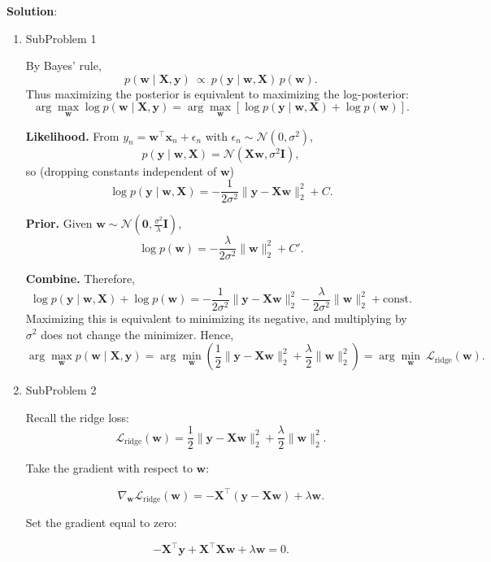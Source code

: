 \documentclass[submit]{harvardml}
\newenvironment{solution}{
    \vspace{2mm}
    \color{blue}\noindent\textbf{Solution}:
}{}
\begin{document}
\begin{solution}
	\begin{enumerate}
	    \item SubProblem 1

By Bayes' rule,
\[
p(\mathbf w\mid \mathbf X,\mathbf y)\ \propto\ p(\mathbf y\mid \mathbf w,\mathbf X)\,p(\mathbf w).
\]
Thus maximizing the posterior is equivalent to maximizing the log-posterior:
\[
\arg\max_{\mathbf w}\log p(\mathbf w\mid \mathbf X,\mathbf y)
=
\arg\max_{\mathbf w}\left[\log p(\mathbf y\mid \mathbf w,\mathbf X)+\log p(\mathbf w)\right].
\]

\textbf{Likelihood.}
From $y_n=\mathbf w^\top \mathbf x_n+\epsilon_n$ with $\epsilon_n\sim\mathcal N(0,\sigma^2)$,
\[
p(\mathbf y\mid \mathbf w,\mathbf X)=\mathcal N(\mathbf X\mathbf w,\sigma^2\mathbf I),
\]
so (dropping constants independent of $\mathbf w$)
\[
\log p(\mathbf y\mid \mathbf w,\mathbf X)
= -\frac{1}{2\sigma^2}\|\mathbf y-\mathbf X\mathbf w\|_2^2 + C.
\]

\textbf{Prior.}
Given $\mathbf w\sim \mathcal N\!\left(\mathbf 0,\frac{\sigma^2}{\lambda}\mathbf I\right)$,
\[
\log p(\mathbf w)
= -\frac{\lambda}{2\sigma^2}\|\mathbf w\|_2^2 + C'.
\]

\textbf{Combine.}
Therefore,
\[
\log p(\mathbf y\mid \mathbf w,\mathbf X)+\log p(\mathbf w)
=
-\frac{1}{2\sigma^2}\|\mathbf y-\mathbf X\mathbf w\|_2^2
-\frac{\lambda}{2\sigma^2}\|\mathbf w\|_2^2
+ \text{const}.
\]
Maximizing this is equivalent to minimizing its negative, and multiplying by $\sigma^2$ does not change
the minimizer. Hence,
\[
\arg\max_{\mathbf w} p(\mathbf w\mid \mathbf X,\mathbf y)
=
\arg\min_{\mathbf w}\left(
\frac{1}{2}\|\mathbf y-\mathbf X\mathbf w\|_2^2
+\frac{\lambda}{2}\|\mathbf w\|_2^2
\right)
=
\arg\min_{\mathbf w}\ \mathcal L_{\text{ridge}}(\mathbf w).
\]

\item SubProblem 2 

Recall the ridge loss:
\[
\mathcal L_{\text{ridge}}(\mathbf w)
=
\frac{1}{2}\|\mathbf y-\mathbf X\mathbf w\|_2^2
+
\frac{\lambda}{2}\|\mathbf w\|_2^2.
\]

Take the gradient with respect to $\mathbf w$:

\[
\nabla_{\mathbf w}\mathcal L_{\text{ridge}}(\mathbf w)
=
- \mathbf X^\top(\mathbf y-\mathbf X\mathbf w)
+
\lambda \mathbf w.
\]

Set the gradient equal to zero:

\[
- \mathbf X^\top \mathbf y
+ \mathbf X^\top \mathbf X \mathbf w
+ \lambda \mathbf w
= 0.
\]


\end{enumerate}
\end{solution}
\end{document}
